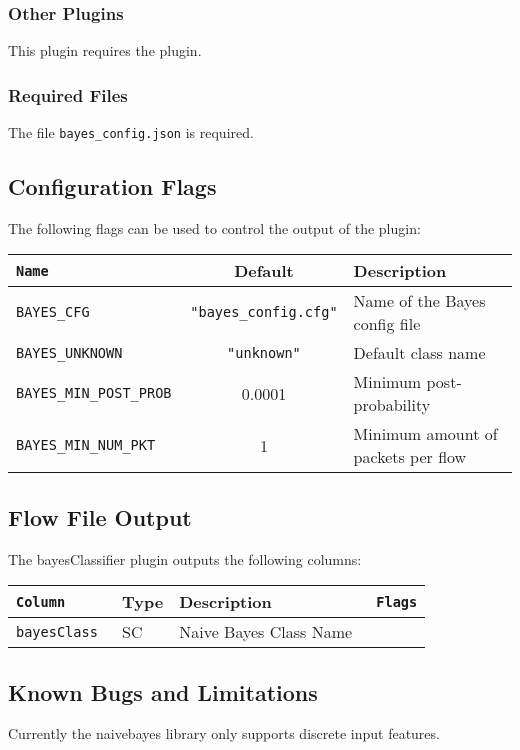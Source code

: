 \documentclass[documentation]{subfiles}
\begin{document}
\subsubsection{Other Plugins}
This plugin requires the  plugin.

\subsubsection{Required Files}
The file {\tt bayes\_config.json} is required.

\subsection{Configuration Flags}
The following flags can be used to control the output of the plugin:
\begin{longtable}{>{\tt}lcl}
    \toprule
    {\bf Name} & {\bf Default} & {\bf Description}\\
    \midrule\endhead%
    BAYES\_CFG             & {\tt\small "bayes\_config.cfg"} & Name of the Bayes config file\\
    BAYES\_UNKNOWN         & {\tt\small "unknown"}           & Default class name\\
    BAYES\_MIN\_POST\_PROB & 0.0001                          & Minimum post-probability\\
    BAYES\_MIN\_NUM\_PKT   & 1                               & Minimum amount of packets per flow\\
    \bottomrule
\end{longtable}

\subsection{Flow File Output}
The bayesClassifier plugin outputs the following columns:
\begin{longtable}{>{\tt}lll>{\tt\small}l}
    \toprule
    {\bf Column} & {\bf Type} & {\bf Description} & {\bf Flags}\\
    \midrule\endhead%
    bayesClass & SC & Naive Bayes Class Name & \\
    \bottomrule
\end{longtable}

\subsection{Known Bugs and Limitations}
Currently the naivebayes library only supports discrete input features.
\end{document}
